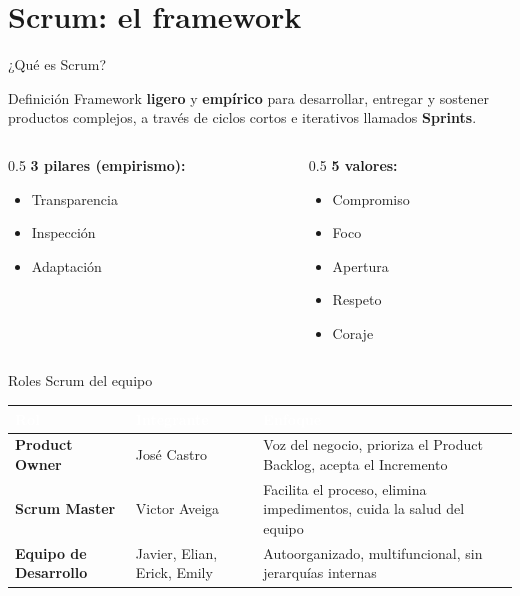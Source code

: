 \documentclass[11pt,aspectratio=169]{beamer}
\begin{document}
\section{Scrum: el framework}

\begin{frame}{¿Qué es Scrum?}
  \begin{block}{Definición}
    Framework \textbf{ligero} y \textbf{empírico} para desarrollar, entregar y sostener productos
    complejos, a través de ciclos cortos e iterativos llamados \textbf{Sprints}.
  \end{block}
  \begin{columns}[T]
    \begin{column}{0.5\textwidth}
      \textbf{3 pilares (empirismo):}
      \begin{itemize}
        \item Transparencia
        \item Inspección
        \item Adaptación
      \end{itemize}
    \end{column}
    \begin{column}{0.5\textwidth}
      \textbf{5 valores:}
      \begin{itemize}
        \item Compromiso \quad \item Foco
        \item Apertura \quad \item Respeto
        \item Coraje
      \end{itemize}
    \end{column}
  \end{columns}
\end{frame}

\begin{frame}{Roles Scrum del equipo}
  \renewcommand{\arraystretch}{1.4}
  \begin{table}
    \small
    \begin{tabular}{|>{\bfseries}p{2.6cm}|p{3.2cm}|p{5.5cm}|}
      \hline
      \rowcolor{epnblue}
      \textcolor{white}{Rol} & \textcolor{white}{Integrante} & \textcolor{white}{Enfoque} \\
      \hline
      Product Owner & José Castro & Voz del negocio, prioriza el Product Backlog, acepta el Incremento \\
      \hline
      \rowcolor{epnrow}
      Scrum Master & Victor Aveiga & Facilita el proceso, elimina impedimentos, cuida la salud del equipo \\
      \hline
      Equipo de Desarrollo & Javier, Elian, Erick, Emily & Autoorganizado, multifuncional, sin jerarquías internas \\
      \hline
    \end{tabular}
  \end{table}
\end{frame}
\end{document}
